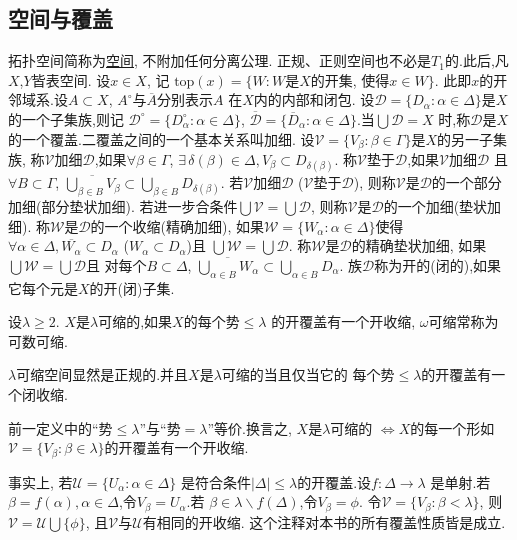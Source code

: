 \documentclass[main.tex]{subfiles}
\begin{document}
\subsection{空间与覆盖}\label{ch1.1.2}
拓扑空间简称为\underline{空间}, 不附加任何分离公理.
正规、正则空间也不必是$T_1$的.此后,凡$X$,$Y$皆表空间.
设$x\in X$, 记
$\textrm{top}(x) = \{W: W$是$X$的开集, 使得$ x\in W\}$.
此即$x$的开邻域系.设$A\subset X$, $A^\circ$与$\overline{A}$分别表示$A$ 在$X$内的内部和闭包.
设$\mathscr{D}=\{D_\alpha:\alpha\in\Delta\}$是$X$的一个子集族,则记
$\mathscr{D}^\circ=\{D^\circ_\alpha:\alpha\in\Delta\}$,
$\overline{\mathscr{D}}=\{\overline{D}_\alpha:\alpha\in\Delta\}$.当$\bigcup\mathscr{D} = X$
时,称$\mathscr{D}$是$X$的一个覆盖.二覆盖之间的一个基本关系叫加细.
设$\mathscr{V}=\{V_\beta:\beta\in\Gamma\}$是$X$的另一子集族,
称$\mathscr{V}$加细$\mathscr{D}$,如果$\forall\beta\in\Gamma$, 
$\exists\, \delta (\beta)\in\Delta, V_\beta\subset D_{\delta(\beta)}$.
称$\mathscr{V}$垫于$\mathscr{D}$,如果$\mathscr{V}$加细$\mathscr{D}$
且$\forall B\subset\Gamma$, 
$\overline{\bigcup_{\beta\in B}V_\beta}\subset \bigcup_{\beta\in B}D_{\delta(\beta)}$.
若$\mathscr{V}$加细$\mathscr{D}$
($\mathscr{V}$垫于$\mathscr{D}$),
则称$\mathscr{V}$是$\mathscr{D}$的一个部分加细(部分垫状加细).
若进一步合条件$\bigcup\mathscr{V}=\bigcup\mathscr{D}$,
则称$\mathscr{V}$是$\mathscr{D}$的一个加细(垫状加细).
称$\mathscr{W}$是$\mathscr{D}$的一个收缩(精确加细),
如果$\mathscr{W}=\{W_\alpha: \alpha\in\Delta\}$使得
$\forall\alpha\in \Delta, \overline{W_\alpha}\subset D_\alpha$
($W_\alpha\subset D_\alpha$)且
$\bigcup\mathscr{W}  = \bigcup \mathscr{D}$.
称$\mathscr{W}$是$\mathscr{D}$的精确垫状加细,
如果$\bigcup\mathscr{W}  = \bigcup \mathscr{D}$且
对每个$B\subset \Delta$, 
$\overline{\bigcup_{\alpha\in B}W_\alpha}  \subset \bigcup_{\alpha\in B}D_\alpha$.
族$\mathscr{D}$称为开的(闭的),如果它每个元是$X$的开(闭)子集.

\begin{definition}
设$\lambda \ge2$. $X$是$\lambda$可缩的,如果$X$的每个势$\le \lambda$
的开覆盖有一个开收缩, $\omega$可缩常称为可数可缩.
\end{definition}
$\lambda$可缩空间显然是正规的.并且$X$是$\lambda$可缩的当且仅当它的
每个势$\le \lambda$的开覆盖有一个闭收缩.

\begin{note}\begin{songti}
前一定义中的“势$\le \lambda$”与“势$= \lambda$”等价.换言之,
$X$是$\lambda$可缩的 $\Leftrightarrow X$的每一个形如
$\mathscr{V}=\{V_\beta: \beta\in\lambda\}$的开覆盖有一个开收缩. 

事实上, 若$\mathscr{U}=\{U_\alpha: \alpha\in\Delta\}$
是符合条件$|\Delta|\le\lambda$的开覆盖.设$f: \Delta\to\lambda$
是单射.若$\beta=f(\alpha), \alpha\in\Delta$,令$V_\beta=U_\alpha$.若
$\beta\in \lambda\backslash f(\Delta)$,令$V_\beta=\phi$. 
令$\mathscr{V}=\{V_\beta: \beta < \lambda\}$,
则$\mathscr{V}=\mathscr{U}\bigcup\{\phi\}$, 且$\mathscr{V}$与$\mathscr{U}$有相同的开收缩.
这个注释对本书的所有覆盖性质皆是成立.
\end{songti}
\end{note}
\end{document}
